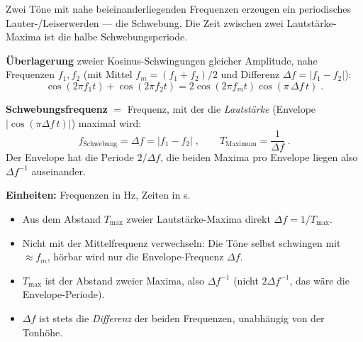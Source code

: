 

Zwei Töne mit nahe beieinanderliegenden Frequenzen erzeugen ein periodisches
Lauter-/Leiserwerden --- die Schwebung. Die Zeit zwischen zwei Lautstärke-Maxima
ist die halbe Schwebungsperiode.

\begin{werkzeugkasten}[Werkzeuge]
\textbf{Überlagerung} zweier Kosinus-Schwingungen gleicher Amplitude, nahe
Frequenzen $f_1,f_2$ (mit Mittel $f_m=(f_1+f_2)/2$ und Differenz
$\Delta f=|f_1-f_2|$):
\begin{equation}
  \cos(2\pi f_1t)+\cos(2\pi f_2t)
  =2\cos(2\pi f_m t)\cos(\pi\,\Delta f\, t)\;.
\end{equation}

\textbf{Schwebungsfrequenz} $=$ Frequenz, mit der die \emph{Lautstärke}
(Envelope $|\cos(\pi\Delta f\,t)|$) maximal wird:
\begin{equation}
  f_{\mathrm{Schwebung}}=\Delta f=|f_1-f_2|\;,
  \qquad
  T_{\mathrm{Maximum}}=\frac{1}{\Delta f}\;.
\end{equation}
Der Envelope hat die Periode $2/\Delta f$, die beiden Maxima pro Envelope
liegen also $\Delta f^{-1}$ auseinander.

\textbf{Einheiten:} Frequenzen in \unit{\hertz}, Zeiten in \unit{\second}.
\end{werkzeugkasten}

\begin{werkzeugkasten}[Vorgehen]
\begin{itemize}
  \item Aus dem Abstand $T_{\max}$ zweier Lautstärke-Maxima direkt
       $\Delta f=1/T_{\max}$.
  \item Nicht mit der Mittelfrequenz verwechseln: Die Töne selbst schwingen
       mit $\approx f_m$, hörbar wird nur die Envelope-Frequenz $\Delta f$.
\end{itemize}
\end{werkzeugkasten}

\begin{achtung}
\begin{itemize}
  \item $T_{\max}$ ist der Abstand zweier Maxima, also $\Delta f^{-1}$
       (nicht $2\Delta f^{-1}$, das wäre die Envelope-Periode).
  \item $\Delta f$ ist stets die \emph{Differenz} der beiden Frequenzen,
       unabhängig von der Tonhöhe.
\end{itemize}
\end{achtung}
